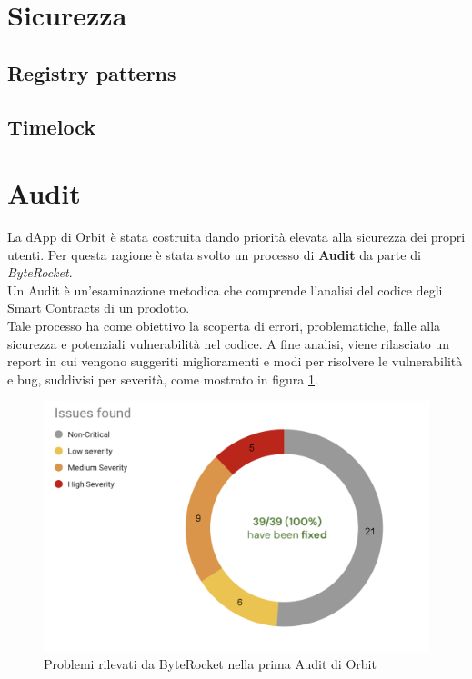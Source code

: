 \documentclass[12pt,a4paper]{report}
\begin{document}
\section{Sicurezza}

\subsection{Registry patterns} \label{registry}

\subsection{Timelock}

\section{Audit}

La dApp di Orbit è stata costruita dando priorità elevata alla sicurezza dei propri utenti. Per questa ragione è stata svolto un processo di \textbf{Audit}\cite{audit} da parte di \textit{ByteRocket}.
\\Un Audit è un'esaminazione metodica che comprende l'analisi del codice degli Smart Contracts di un prodotto. \\Tale processo ha come obiettivo la scoperta di errori, problematiche, falle alla sicurezza e potenziali vulnerabilità nel codice. A fine analisi, viene rilasciato un report in cui vengono suggeriti miglioramenti e modi per risolvere le vulnerabilità e bug, suddivisi per severità, come mostrato in figura \ref{fig:audit}. 

\begin{figure}[H]
  \includegraphics[scale=0.40]{audit.png}
  \centering
  \caption{Problemi rilevati da ByteRocket nella prima Audit di Orbit}
  \label{fig:audit}
\end{figure}
\end{document}
